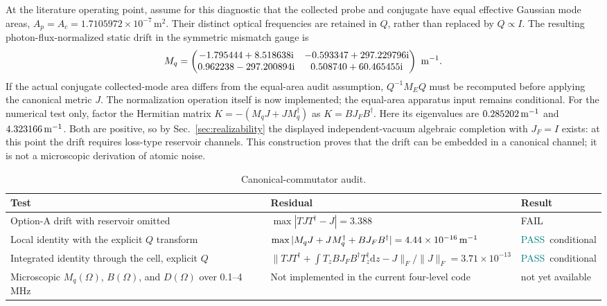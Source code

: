 \documentclass[11pt,a4paper]{article}
\newcommand{\dd}{\mathrm d}
\newcommand{\ii}{\mathrm i}
\newcommand{\pending}{\textcolor{amber}{not yet available}}
\newcommand{\pass}{\textcolor{teal}{PASS}}
\newcommand{\fail}{\textcolor{red!70!black}{FAIL}}
\begin{document}
At the literature operating point, assume for this diagnostic that
the collected probe and conjugate have equal effective Gaussian mode areas,
$A_p=A_c=1.7105972\times10^{-7}\,\mathrm{m^2}$. Their distinct optical
frequencies are retained in $Q$, rather than replaced by $Q\propto I$.
The resulting photon-flux-normalized static drift in the
symmetric mismatch gauge is
\begin{equation}
M_q=
\begin{pmatrix}
-1.795444+8.518638\ii&-0.593347+297.229796\ii\\
0.962238-297.200894\ii&0.508740+60.465455\ii
\end{pmatrix}\ {\rm m}^{-1}.
\label{eq:corrected-literature-drift}
\end{equation}
If the actual conjugate collected-mode area differs from the equal-area audit
assumption, $Q^{-1}M_EQ$ must be recomputed before applying the canonical
metric $J$. The normalization operation itself is now implemented; the
equal-area apparatus input remains conditional.
For the numerical test only, factor the Hermitian matrix
$K=-(M_qJ+JM_q^\dagger)$ as $K=BJ_FB^\dagger$. Here its eigenvalues are
$0.285202\,{\rm m}^{-1}$ and $4.323166\,{\rm m}^{-1}$. Both are positive, so
by Sec.~\ref{sec:realizability} the displayed independent-vacuum algebraic
completion with
$J_F=I$ exists: at this point the drift requires loss-type reservoir
channels.
This construction proves that the drift can be embedded in a canonical
channel; it is not a microscopic derivation of atomic noise.

\begin{table}[ht]
\centering
\caption{Canonical-commutator audit.}
\label{tab:commutator-test}
\small
\begin{tabularx}{\textwidth}{L{4.2cm}Y L{2.0cm}}
\toprule
Test & Residual & Result\\
\midrule
Option-A drift with reservoir omitted &
$\max|TJT^\dagger-J|=3.388$ & \fail\\
Local identity with the explicit $Q$ transform &
$\max|M_qJ+JM_q^\dagger+BJ_FB^\dagger|=4.44\times10^{-16}\,{\rm m}^{-1}$ &
\pass\ conditional\\
Integrated identity through the cell, explicit $Q$ &
$\|TJT^\dagger+\int T_zBJ_FB^\dagger T_z^\dagger\dd z-J\|_F/
\|J\|_F=3.71\times10^{-13}$ & \pass\ conditional\\
Microscopic $M_q(\Omega)$, $B(\Omega)$, and $D(\Omega)$ over 0.1--4 MHz &
Not implemented in the current four-level code & \pending\\
\bottomrule
\end{tabularx}
\end{table}
\end{document}
